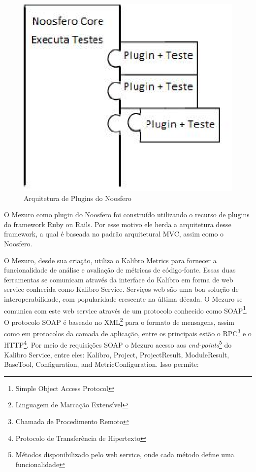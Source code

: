 \graphicspath{{figuras/}}
\begin{figure}[H]
\centering
\includegraphics{plugins}
\caption{Arquitetura de Plugins do Noosfero}
\label{Rotulo}
\end{figure}

O Mezuro como plugin do Noosfero foi construído utilizando o recurso de plugins do framework Ruby on Rails. Por esse motivo ele herda a arquitetura desse framework, a qual é baseada no padrão arquitetural MVC, assim como o Noosfero.

O Mezuro, desde sua criação, utiliza o Kalibro Metrics para fornecer a funcionalidade de análise e avaliação de métricas de código-fonte. Essas duas ferramentas se comunicam através da interface do Kalibro em forma de web service conhecida como Kalibro Service. Serviços web são uma boa solução de interoperabilidade, com popularidade crescente na última década. O Mezuro se comunica com este web service através de um protocolo conhecido como SOAP\footnote{Simple Object Access Protocol}. O protocolo SOAP é baseado no XML\footnote{Linguagem de Marcação Extensível} para o formato de mensagens, assim como em protocolos da camada de aplicação, entre os principais estão o RPC\footnote{Chamada de Procedimento Remoto} e o HTTP\footnote{Protocolo de Transferência de Hipertexto}. Por meio de requisições SOAP o Mezuro acesso aos \textit{end-points}\footnote{Métodos disponibilizado pelo web service, onde cada método define uma funcionalidade} do Kalibro Service, entre eles: Kalibro, Project, ProjectResult, ModuleResult, BaseTool, Configuration, and MetricConfiguration. Isso permite:


